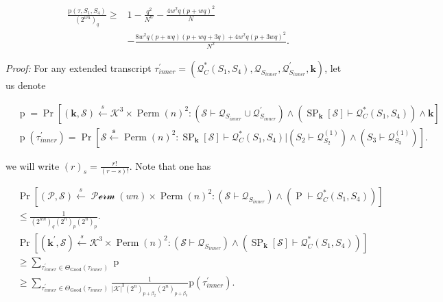 \begin{equation}
\begin{aligned}
\frac{\mathrm{p}\left(\tau, S_{1}, S_{4}\right)}{\left(2^{w n}\right)_{q}} \geq &1-\frac{q^2}{N^w}- \frac{4 w^2 q(p+wq)^2}{N}\\
&- \frac{8 w^2 q(p+w q)(p+w q +3 q)+4 w^2 q(p+3 wq)^2}{N^2}.
\end{aligned}
\end{equation}

\noindent \emph{Proof:}  For any extended transcript $\tau_{inner}^{\prime}=\left(\mathcal{Q}_{C}^{*}\left(S_{1}, S_{4}\right), \mathcal{Q}_{S_{inner}}, \mathcal{Q}_{S_{inner}}^{\prime}, \mathbf{k}\right)$, let us denote

$$
\begin{aligned}
&\operatorname{p} =  \operatorname{Pr}\left[\left(\mathbf{k}, \mathcal{S}\right) \stackrel{s}{\leftarrow} \mathcal{K}^{3} \times \operatorname{Perm}(n)^{2}:
\left(\mathcal{S} \vdash \mathcal{Q}_{S_{inner}} \cup \mathcal{Q}_{S_{inner}}^{\prime}\right) \wedge \left(\operatorname{SP}_{\mathbf{k}}[\mathcal{S}] \vdash \mathcal{Q}_{C}^{*}\left(S_{1},S_{4}\right)\right) \wedge\mathbf{k}\right]\\
&\operatorname{p}\left(\tau_{inner}^{\prime}\right) =\operatorname{Pr}\left[\mathcal{S} \stackrel{\mathbf{s}}{\leftarrow} \operatorname{Perm}(n)^{2}: \operatorname{SP}_{\mathbf{k}}[\mathcal{S}] \vdash \mathcal{Q}_{C}^{*}\left(S_{1},S_{4}\right) |\left(S_{2} \vdash \mathcal{Q}_{S_{2}}^{(1)}\right) \wedge\left(S_{3} \vdash \mathcal{Q}_{S_{3}}^{(1)}\right)\right].
\end{aligned}
$$

we will write $(r)_{s} = \frac{r!}{(r-s)!}$. Note that one has

$$
\begin{aligned}
&\operatorname{Pr}\left[(\mathcal{P}, \mathcal{S}) \stackrel{s}{\leftarrow} \mathcal{\operatorname{Perm}}(w n) \times \operatorname{Perm}(n)^{2}:\left(\mathcal{S} \vdash \mathcal{Q}_{S_{inner}}\right) \wedge\left(\operatorname{P} \vdash \mathcal{Q}_{C}^{*}\left(S_{1},S_{4}\right)\right)\right] \\
&\leq  \frac{1}{\left(2^{w n}\right)_{q}\left(2^{n}\right)_{p}\left(2^{n}\right)_{p}}. \\
&\operatorname{Pr}\left[(\mathbf{k}^{\prime}, \mathcal{S}) \stackrel{s}{\leftarrow} \mathcal{K}^{3} \times \operatorname{Perm}(n)^{2}:\left(\mathcal{S} \vdash \mathcal{Q}_{S_{inner}}\right) \wedge\left(\operatorname{SP}_{\mathbf{k}}[\mathcal{S}] \vdash \mathcal{Q}_{C}^{*}\left(S_{1},S_{4}\right)\right)\right] \\
& \geq \sum_{\tau_{inner}^{\prime} \in \Theta_{\mathrm{Good}}(\tau_{inner})} \operatorname{p}\\
&\geq \sum_{\tau_{inner}^{\prime} \in \Theta_{\mathrm{Good}}(\tau_{inner})} \frac{1}{|\mathcal{K}|^{3}\left(2^{n}\right)_{p+\beta_{2}}\left(2^{n}\right)_{p+\beta_{3}}} \mathrm{p}\left(\tau_{inner}^{\prime}\right).
\end{aligned}
$$

